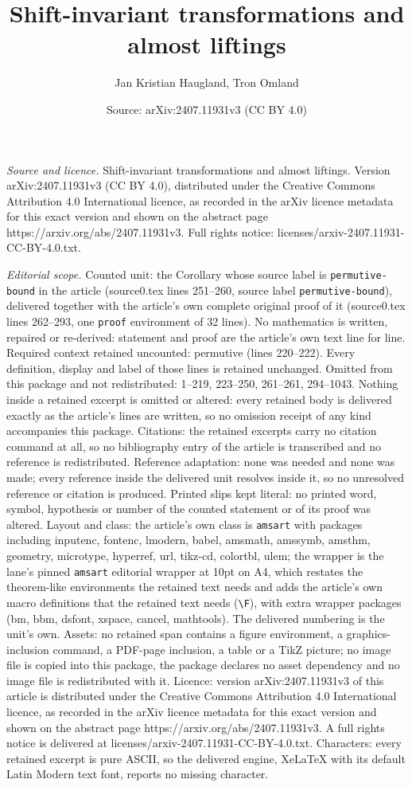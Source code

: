 \documentclass[10pt,a4paper]{amsart}
\title[Shift-invariant transformations and almost liftings]{Shift-invariant transformations and almost liftings}
\author{Jan Kristian Haugland, Tron Omland}
\date{Source: arXiv:2407.11931v3 (CC BY 4.0)}
\begin{document}
\maketitle

\noindent\emph{Source and licence.} Shift-invariant transformations and almost liftings. Version arXiv:2407.11931v3 (CC BY 4.0), distributed under the Creative Commons Attribution 4.0 International licence, as recorded in the arXiv licence metadata for this exact version and shown on the abstract page https://arxiv.org/abs/2407.11931v3. Full rights notice: licenses/arxiv-2407.11931-CC-BY-4.0.txt.\par\smallskip

\noindent\textit{Editorial scope.} Counted unit: the Corollary whose source label is \texttt{permutive-bound} in the article (source0.tex lines 251--260, source label \texttt{permutive-bound}), delivered together with the article's own complete original proof of it (source0.tex lines 262--293, one \texttt{proof} environment of 32 lines). No mathematics is written, repaired or re-derived: statement and proof are the article's own text line for line. Required context retained uncounted: permutive (lines 220--222). Every definition, display and label of those lines is retained unchanged. Omitted from this package and not redistributed: 1--219, 223--250, 261--261, 294--1043. Nothing inside a retained excerpt is omitted or altered: every retained body is delivered exactly as the article's lines are written, so no omission receipt of any kind accompanies this package. Citations: the retained excerpts carry no citation command at all, so no bibliography entry of the article is transcribed and no reference is redistributed. Reference adaptation: none was needed and none was made; every reference inside the delivered unit resolves inside it, so no unresolved reference or citation is produced. Printed slips kept literal: no printed word, symbol, hypothesis or number of the counted statement or of its proof was altered. Layout and class: the article's own class is \texttt{amsart} with packages including inputenc, fontenc, lmodern, babel, amsmath, amssymb, amsthm, geometry, microtype, hyperref, url, tikz-cd, colortbl, ulem; the wrapper is the lane's pinned \texttt{amsart} editorial wrapper at 10pt on A4, which restates the theorem-like environments the retained text needs and adds the article's own macro definitions that the retained text needs (\texttt{\textbackslash F}), with extra wrapper packages (bm, bbm, dsfont, xspace, cancel, mathtools). The delivered numbering is the unit's own. Assets: no retained span contains a figure environment, a graphics-inclusion command, a PDF-page inclusion, a table or a TikZ picture; no image file is copied into this package, the package declares no asset dependency and no image file is redistributed with it. Licence: version arXiv:2407.11931v3 of this article is distributed under the Creative Commons Attribution 4.0 International licence, as recorded in the arXiv licence metadata for this exact version and shown on the abstract page https://arxiv.org/abs/2407.11931v3. A full rights notice is delivered at licenses/arxiv-2407.11931-CC-BY-4.0.txt. Characters: every retained excerpt is pure ASCII, so the delivered engine, XeLaTeX with its default Latin Modern text font, reports no missing character.
\end{document}
